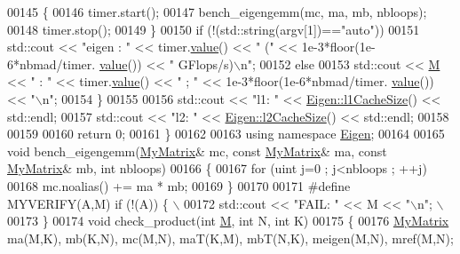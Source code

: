 \begin{DoxyCode}
{{{00145       \{
00146           timer.start();
00147           bench\_eigengemm(mc, ma, mb, nbloops);
00148           timer.stop();
00149       \}
00150       \textcolor{keywordflow}{if} (!(std::string(argv[1])==\textcolor{stringliteral}{"auto"}))
00151         std::cout << \textcolor{stringliteral}{"eigen : "} << timer.\hyperlink{class_eigen_1_1_bench_timer_a26760f963ed8b64c126159bfea57735e}{value}() << \textcolor{stringliteral}{" ("} << 1e-3*floor(1e-6*nbmad/timer.
      \hyperlink{class_eigen_1_1_bench_timer_a26760f963ed8b64c126159bfea57735e}{value}()) << \textcolor{stringliteral}{" GFlops/s)\(\backslash\)n"};
00152       \textcolor{keywordflow}{else}
00153         std::cout << \hyperlink{group___core___module_class_eigen_1_1_matrix}{M} << \textcolor{stringliteral}{" : "} << timer.\hyperlink{class_eigen_1_1_bench_timer_a26760f963ed8b64c126159bfea57735e}{value}() << \textcolor{stringliteral}{" ; "} << 1e-3*floor(1e-6*nbmad/timer.
      \hyperlink{class_eigen_1_1_bench_timer_a26760f963ed8b64c126159bfea57735e}{value}()) << \textcolor{stringliteral}{"\(\backslash\)n"};
00154   \}
00155 
00156   std::cout << \textcolor{stringliteral}{"l1: "} << \hyperlink{namespace_eigen_a2669f89ff38296a38e6d973552eb4e33}{Eigen::l1CacheSize}() << std::endl;
00157   std::cout << \textcolor{stringliteral}{"l2: "} << \hyperlink{namespace_eigen_a2cfc0330ba567d63a496be1cac8427ae}{Eigen::l2CacheSize}() << std::endl;
00158   
00159 
00160   \textcolor{keywordflow}{return} 0;
00161 \}
00162 
00163 \textcolor{keyword}{using namespace }\hyperlink{namespace_eigen}{Eigen};
00164 
00165 \textcolor{keywordtype}{void} bench\_eigengemm(\hyperlink{group___core___module_class_eigen_1_1_matrix}{MyMatrix}& mc, \textcolor{keyword}{const} \hyperlink{group___core___module_class_eigen_1_1_matrix}{MyMatrix}& ma, \textcolor{keyword}{const} 
      \hyperlink{group___core___module_class_eigen_1_1_matrix}{MyMatrix}& mb, \textcolor{keywordtype}{int} nbloops)
00166 \{
00167   \textcolor{keywordflow}{for} (uint j=0 ; j<nbloops ; ++j)
00168       mc.noalias() += ma * mb;
00169 \}
00170 
00171 \textcolor{preprocessor}{#define MYVERIFY(A,M) if (!(A)) \{ \(\backslash\)}
00172 \textcolor{preprocessor}{    std::cout << "FAIL: " << M << "\(\backslash\)n"; \(\backslash\)}
00173 \textcolor{preprocessor}{  \}}
00174 \textcolor{keywordtype}{void} check\_product(\textcolor{keywordtype}{int} \hyperlink{group___core___module_class_eigen_1_1_matrix}{M}, \textcolor{keywordtype}{int} N, \textcolor{keywordtype}{int} K)
00175 \{
00176   \hyperlink{group___core___module_class_eigen_1_1_matrix}{MyMatrix} ma(M,K), mb(K,N), mc(M,N), maT(K,M), mbT(N,K), meigen(M,N), mref(M,N);
}}}
\end{DoxyCode}
